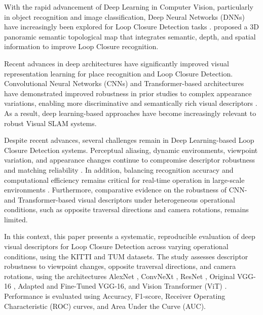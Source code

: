 \documentclass{ieeeaccess}
\begin{document}
With the rapid advancement of Deep Learning in Computer Vision, particularly in object recognition and image classification, Deep Neural Networks (DNNs) have increasingly been explored for Loop Closure Detection tasks \cite{Ng2015LocalDeepFeaturesImageRetrieval}. \cite{Chen2025PanoramicSemanticTopologicalMap} proposed a 3D panoramic semantic topological map that integrates semantic, depth, and spatial information to improve Loop Closure recognition.

Recent advances in deep architectures have significantly improved visual representation learning for place recognition and Loop Closure Detection. Convolutional Neural Networks (CNNs) and Transformer-based architectures have demonstrated improved robustness in prior studies to complex appearance variations, enabling more discriminative and semantically rich visual descriptors \cite{Sunderhauf2015ConvNetPlaceRecognition,Chen2019,AliBey2023MixVPR,Chen2025PanoramicSemanticTopologicalMap}. As a result, deep learning-based approaches have become increasingly relevant to robust Visual SLAM systems.

Despite recent advances, several challenges remain in Deep Learning-based Loop Closure Detection systems. Perceptual aliasing, dynamic environments, viewpoint variation, and appearance changes continue to compromise descriptor robustness and matching reliability \cite{Chen2019,Wang2024SemanticLineGraphLoopClosure}. In addition, balancing recognition accuracy and computational efficiency remains critical for real-time operation in large-scale environments \cite{Arshad2021}. Furthermore, comparative evidence on the robustness of CNN- and Transformer-based visual descriptors under heterogeneous operational conditions, such as opposite traversal directions and camera rotations, remains limited.

In this context, this paper presents a systematic, reproducible evaluation of deep visual descriptors for Loop Closure Detection across varying operational conditions, using the KITTI \cite{Geiger2013KITTI} and TUM \cite{Sturm2012RGBDSLAMBenchmark} datasets. The study assesses descriptor robustness to viewpoint changes, opposite traversal directions, and camera rotations, using the architectures AlexNet \cite{Krizhevsky2017AlexNetCACM}, ConvNeXt \cite{Liu2022ConvNeXt}, ResNet \cite{He2016ResNet}, Original VGG-16 \cite{Simonyan2015VGG}, Adapted and Fine-Tuned VGG-16, and Vision Transformer (ViT) \cite{Dosovitskiy2021ViT}. Performance is evaluated using Accuracy, F1-score, Receiver Operating Characteristic (ROC) curves, and Area Under the Curve (AUC).
\end{document}
